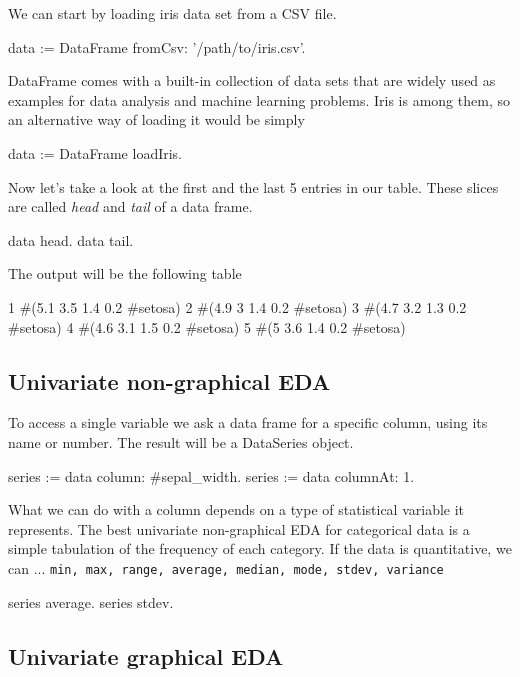 \documentclass{article}
\begin{document}
\begin{multicols}{2}
We can start by loading iris data set from a CSV file.
\begin{code}{}
data := DataFrame fromCsv: '/path/to/iris.csv'.
\end{code}

DataFrame comes with a built-in collection of data sets that are widely used as examples for data analysis and machine learning problems. Iris is among them, so an alternative way of loading it would be simply

\begin{code}{}
data := DataFrame loadIris.
\end{code}

Now let's take a look at the first and the last 5 entries in our table. These slices are called \textit{head} and \textit{tail} of a data frame.

\begin{code}{}
data head.
data tail.
\end{code}

The output will be the following table
\begin{code}{}
1   #(5.1 3.5 1.4 0.2 #setosa)
2	  #(4.9 3 1.4 0.2 #setosa)
3	  #(4.7 3.2 1.3 0.2 #setosa)
4	  #(4.6 3.1 1.5 0.2 #setosa)
5	  #(5 3.6 1.4 0.2 #setosa)

\end{code}

\subsection{Univariate non-graphical EDA}
To access a single variable we ask a data frame for a specific column, using its name or number. The result will be a DataSeries object.

\begin{code}{}
series := data column: #sepal_width.
series := data columnAt: 1.
\end{code}

What we can do with a column depends on a type of statistical variable it represents. The best univariate non-graphical EDA for categorical data is a simple tabulation of the frequency of each category\cite{Seltman}. If the data is quantitative, we can ...
\texttt{min, max, range, average, median, mode, stdev, variance}

\begin{code}{}
series average. 
series stdev.
\end{code}

\subsection{Univariate graphical EDA}

\end{multicols}
\end{document}
